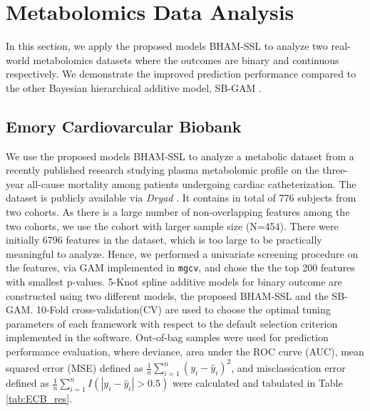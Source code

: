 \documentclass[AMA,STIX1COL,]{WileyNJD-v2}
\begin{document}
\hypertarget{metabolomics-data-analysis}{%
\section{Metabolomics Data Analysis}\label{metabolomics-data-analysis}}

\label{sec:real_data}

In this section, we apply the proposed models BHAM-SSL to analyze two
real-world metabolomics datasets where the outcomes are binary and
continuous respectively. We demonstrate the improved prediction
performance compared to the other Bayesian hierarchical additive model,
SB-GAM \citep{Bai2021}.

\hypertarget{emory-cardiovarcular-biobank}{%
\subsection{Emory Cardiovarcular
Biobank}\label{emory-cardiovarcular-biobank}}

We use the proposed models BHAM-SSL to analyze a metabolic dataset from
a recently published research \citep{Mehta2020} studying plasma
metabolomic profile on the three-year all-cause mortality among patients
undergoing cardiac catheterization. The dataset is publicly available
via \textit{Dryad} \citep{Mehta2020_data}. It contains in total of 776
subjects from two cohorts. As there is a large number of non-overlapping
features among the two cohorts, we use the cohort with larger sample
size (N=454). There were initially 6796 features in the dataset, which
is too large to be practically meaningful to analyze. Hence, we
performed a univariate screening procedure on the features, via GAM
implemented in \texttt{mgcv}, and chose the the top 200 features with
smallest p-values. 5-Knot spline additive models for binary outcome are
constructed using two different models, the proposed BHAM-SSL and the
SB-GAM. 10-Fold cross-validation(CV) are used to choose the optimal
tuning parameters of each framework with respect to the default
selection criterion implemented in the software. Out-of-bag samples were
used for prediction performance evaluation, where deviance, area under
the ROC curve (AUC), mean squared error (MSE) defined as
\(\frac{1}{n}\sum\limits^{n}_{i=1}(y_i - \hat y_i)^2\), and
misclassication error defined as
\(\frac{1}{n}\sum\limits^{n}_{i=1}I(|y_i - \hat y_i|>0.5)\) were
calculated and tabulated in Table \ref{tab:ECB_res}.

\providecommand{\docline}[3]{\noalign{\global\setlength{\arrayrulewidth}{#1}}\arrayrulecolor[HTML]{#2}\cline{#3}}
\end{document}
